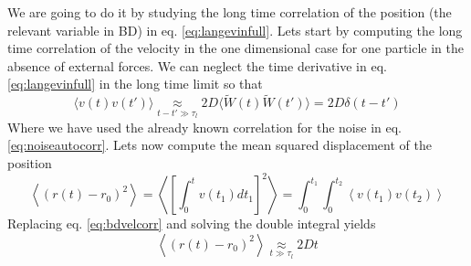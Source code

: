 \documentclass[ twoside,openright,titlepage,numbers=noenddot,%
headinclude,footinclude,cleardoublepage=empty,abstract=on,
BCOR=5mm,paper=a4,fontsize=11pt, dvipsnames
]{scrreprt}
\newcommand{\kT}{k_B T}
\newcommand{\noise}{\widetilde{W}}
\begin{document}
We are going to do it by studying the long time correlation of the position (the relevant variable in \gls{BD}) in eq. \eqref{eq:langevinfull}. Lets start by computing the long time correlation of the velocity in the one dimensional case for one particle in the absence of external forces.
We can neglect the time derivative in eq. \eqref{eq:langevinfull} in the long time limit so that
\begin{equation}
  \label{eq:bdvelcorr}
  \langle v(t) v(t') \rangle \underset{t-t'\gg\tau_l}{\approx} 2D\langle \noise(t)\noise(t')\rangle = 2D\delta(t-t')
\end{equation}
Where we have used the already known correlation for the noise in eq. \eqref{eq:noiseautocorr}.
Lets now compute the mean squared displacement of the position
\begin{equation}
  \left\langle(r(t) - r_0)^2 \right\rangle = \left\langle\left[ \int_0^{t}v(t_1)dt_1 \right]^2 \right\rangle = \int_0^{t_1}{\int_0^{t_2}{\left\langle v(t_1)v(t_2)\right\rangle}}
\end{equation}
Replacing eq. \eqref{eq:bdvelcorr} and solving the double integral yields
\begin{equation}
  \left\langle(r(t) - r_0)^2 \right\rangle \underset{t\gg\tau_l}{\approx}  2Dt %
\end{equation}
\end{document}
